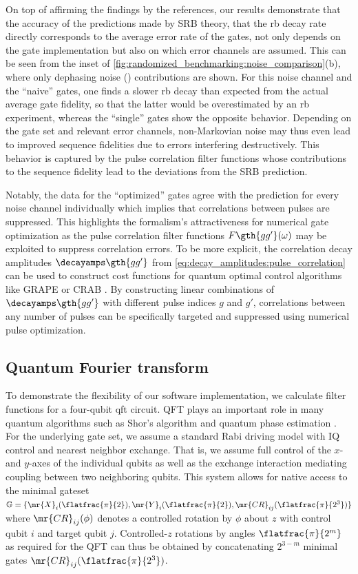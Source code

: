 On top of affirming the findings by the references, our results demonstrate that the accuracy of the predictions made by SRB theory, \ie that the \gls{rb} decay rate directly corresponds to the average error rate of the gates, not only depends on the gate implementation but also on which error channels are assumed. This can be seen from the inset of \cref{fig:randomized_benchmarking:noise_comparison}(b), where only dephasing noise (\pz) contributions are shown. For this noise channel and the \enquote{naive} gates, one finds a slower \gls{rb} decay than expected from the actual average gate fidelity, so that the latter would be overestimated by an \gls{rb} experiment, whereas the \enquote{single} gates show the opposite behavior. Depending on the gate set and relevant error channels, non-Markovian noise may thus even lead to improved sequence fidelities due to errors interfering destructively. This behavior is captured by the pulse correlation filter functions whose contributions to the sequence fidelity lead to the deviations from the SRB prediction.

Notably, the data for the \enquote{optimized} gates agree with the prediction for every noise channel individually which implies that correlations between pulses are suppressed. This highlights the formalism's attractiveness for numerical gate optimization as the pulse correlation filter functions $F\gth{gg'}(\omega)$ may be exploited to suppress correlation errors. To be more explicit, the correlation decay amplitudes $\decayamps\gth{gg'}$ from \cref{eq:decay_amplitudes:pulse_correlation} can be used to construct cost functions for quantum optimal control algorithms like GRAPE \cite{Khaneja2005,Schulte-Herbruggen2005} or CRAB \cite{Caneva2011}. By constructing linear combinations of $\decayamps\gth{gg'}$ with different pulse indices $g$ and $g'$, correlations between any number of pulses can be specifically targeted and suppressed using numerical pulse optimization.

\subsection{Quantum Fourier transform}\label{sec:examples:qft}
To demonstrate the flexibility of our software implementation, we calculate filter functions for a four-qubit \acrfull{qft} \cite{Coppersmith1994,NielsenChuang2011} circuit. QFT plays an important role in many quantum algorithms such as Shor's algorithm \cite{Shor1997} and quantum phase estimation \cite{NielsenChuang2011}. For the underlying gate set, we assume a standard Rabi driving model with IQ control and nearest neighbor exchange. That is, we assume full control of the $x$- and $y$-axes of the individual qubits as well as the exchange interaction mediating coupling between two neighboring qubits. This system allows for native access to the minimal gateset $\mathbb{G} = \lbrace\mr{X}_{i}(\flatfrac{\pi}{2}),\mr{Y}_{i}(\flatfrac{\pi}{2}),\mr{CR}_{ij}(\flatfrac{\pi}{2^3})\rbrace$ where $\mr{CR}_{ij}(\phi)$ denotes a controlled rotation by $\phi$ about $z$ with control qubit $i$ and target qubit $j$. Controlled-$z$ rotations by angles $\flatfrac{\pi}{2^m}$ as required for the QFT can thus be obtained by concatenating $2^{3-m}$ minimal gates $\mr{CR}_{ij}(\flatfrac{\pi}{2^3})$.

